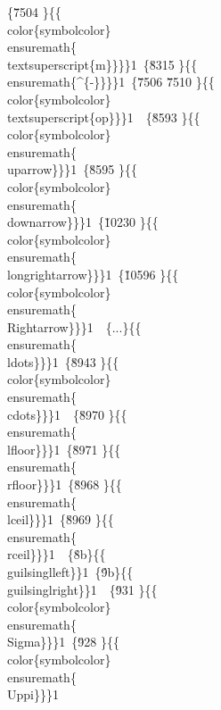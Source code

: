 {\{\u7504 \}\{\{\\color\{symbolcolor\}\\ensuremath\{\\textsuperscript\{m\}\}\}\}1\
\{\u8315 \}\{\{\\ensuremath\{^\{-\}\}\}\}1\
\{\u7506 \u7510 \}\{\{\\color\{symbolcolor\}\\textsuperscript\{op\}\}\}1\
\
\{\u8593 \}\{\{\\color\{symbolcolor\}\\ensuremath\{\\uparrow\}\}\}1\
\{\u8595 \}\{\{\\color\{symbolcolor\}\\ensuremath\{\\downarrow\}\}\}1\
\{\u10230 \}\{\{\\color\{symbolcolor\}\\ensuremath\{\\longrightarrow\}\}\}1\
\{\u10596 \}\{\{\\color\{symbolcolor\}\\ensuremath\{\\Rightarrow\}\}\}1\
\
\{...\}\{\{\\ensuremath\{\\ldots\}\}\}1\
\{\u8943 \}\{\{\\color\{symbolcolor\}\\ensuremath\{\\cdots\}\}\}1\
\
\{\u8970 \}\{\{\\ensuremath\{\\lfloor\}\}\}1\
\{\u8971 \}\{\{\\ensuremath\{\\rfloor\}\}\}1\
\{\u8968 \}\{\{\\ensuremath\{\\lceil\}\}\}1\
\{\u8969 \}\{\{\\ensuremath\{\\rceil\}\}\}1\
\
\{\'8b\}\{\{\\guilsinglleft\}\}1\
\{\'9b\}\{\{\\guilsinglright\}\}1\
\
\{\u931 \}\{\{\\color\{symbolcolor\}\\ensuremath\{\\Sigma\}\}\}1\
\{\u928 \}\{\{\\color\{symbolcolor\}\\ensuremath\{\\Uppi\}\}\}1 %
}
